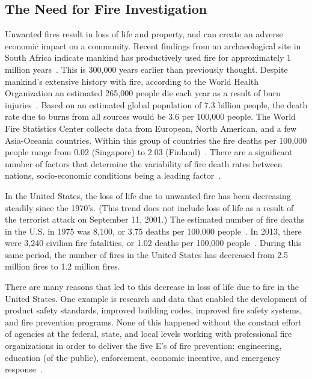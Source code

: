\documentclass[twoside]{uocthesis}
\begin{document}
\subsection{The Need for Fire Investigation}
Unwanted fires result in loss of life and property, and can create an adverse economic impact on a community.  Recent findings from an archaeological site in South Africa indicate mankind has productively used fire for approximately 1 million years~\cite{Berna:2012}.  This is 300,000 years earlier than previously thought.  Despite mankind's extensive history with fire, according to the World Health Organization an estimated 265,000 people die each year as a result of burn injuries~\cite{WHO:2014}.  Based on an estimated global population of 7.3 billion people, the death rate due to burns from all sources would be 3.6 per 100,000 people.  The World Fire Statistics Center collects data from European, North American, and a few Asia-Oceania countries.  Within this group of countries the fire deaths per 100,000 people range from 0.02 (Singapore) to 2.03 (Finland)~\cite{Climate:2014}. There are a significant number of factors that determine the variability of fire death rates between nations, socio-economic conditions being a leading factor~\cite{WHO:2014}.

In the United States, the loss of life due to unwanted fire has been decreasing steadily since the 1970’s.  (This trend does not include loss of life as a result of the terrorist attack on September 11, 2001.)  The estimated number of fire deaths in the U.S. in 1975 was 8,100, or 3.75 deaths per 100,000 people~\cite{America_Burning_Revisited}.  In 2013, there were 3,240 civilian fire fatalities, or 1.02 deaths per 100,000 people~\cite{Karter:2014}.  During this same period, the number of fires in the United States has decreased from 2.5 million fires to 1.2 million fires.  

There are many reasons that led to this decrease in loss of life due to fire in the United States.  One example is research and data that enabled the development of product safety standards, improved building codes, improved fire safety systems, and fire prevention programs.  None of this happened without the constant effort of agencies at the federal, state, and local levels working with professional fire organizations in order to deliver the five E’s of fire prevention: engineering, education (of the public), enforcement, economic incentive, and emergency response~\cite{FEMA:2013}.
\end{document}
